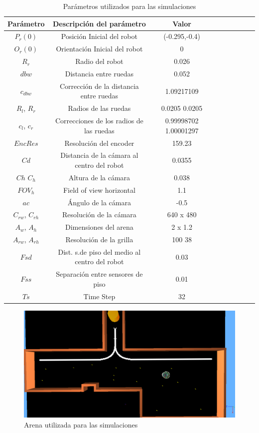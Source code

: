 \begin{table}[ht]
	\begin{center}
		\begin{tabular}{|c|c|c|c|c|c|c|c|c|}
			\hline
			Par\'ametro & Descripci\'on del par\'ametro & Valor \\
			\hline
			$P_r(0)$ & Posici\'on Inicial del robot & (-0.295,-0.4) \\
			$O_r(0)$ & Orientaci\'on Inicial del robot & 0 \\
			$R_r$ & Radio del robot & 0.026 \\
			$dbw$ & Distancia entre ruedas & 0.052 \\
			$c_{dbw}$ & Correcci\'on de la distancia entre ruedas & 1.09217109 \\
			$R_l$, $R_r$ & Radios de las ruedas & 0.0205 0.0205 \\
			$c_l$, $c_r$ & Correcciones de los radios de las ruedas & 0.99998702 1.00001297 \\
			$EncRes$ & Resoluci\'on del encoder & 159.23 \\
			$Cd$ & Distancia de la c\'amara al centro del robot & 0.0355 \\
			$Ch$ $C_h$ & Altura de la c\'amara & 0.038 \\
			$FOV_h$ & Field of view horizontal & 1.1 \\
			$ac$ & \'Angulo de la c\'amara & -0.5 \\
			$C_{rw}$, $C_{rh}$ & Resoluci\'on de la c\'amara & 640 x 480 \\
			$A_w$, $A_h$ & Dimensiones del arena & 2 x 1.2 \\
			$A_{rw}$, $A_{rh}$ & Resoluci\'on de la grilla & 100 38\\
			$Fsd$ & Dist. s.de piso del medio al centro del robot & 0.03 \\
			$Fss$ & Separaci\'on entre sensores de piso & 0.01 \\
			$Ts$ & Time Step & 32 \\
			\hline
		\end{tabular}
	\end{center}
	\caption{Par\'ametros utilizados para las simulaciones}
	\label{sim_params}
\end{table}

\begin{figure}[htp]
\begin{center}
\includegraphics[scale=0.25]{comportamientos/arenaSim.png}
\caption{Arena utilizada para las simulaciones}
\label{fig:arena_sim}
\end{center}
\end{figure}


